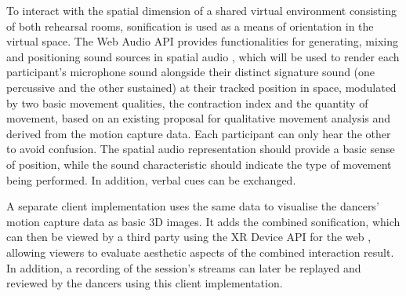 To interact with the spatial dimension of a shared virtual environment consisting of both rehearsal rooms, sonification is used as a means of orientation in the virtual space. The Web Audio \ac{API} provides functionalities for generating, mixing and positioning sound sources in spatial audio \parencite{webAudioSpec}, which will be used to render each participant's microphone sound alongside their distinct signature sound (one percussive and the other sustained) at their tracked position in space, modulated by two basic movement qualities, the contraction index and the quantity of movement, based on an existing proposal for qualitative movement analysis \parencite{movementQualities} and derived from the motion capture data. Each participant can only hear the other to avoid confusion. The spatial audio representation should provide a basic sense of position, while the sound characteristic should indicate the type of movement being performed. In addition, verbal cues can be exchanged.

A separate client implementation uses the same data to visualise the dancers' motion capture data as basic \ac{3D} images. It adds the combined sonification, which can then be viewed by a third party using the \ac{XR} Device \ac{API} for the web \parencite{webXrSpec}, allowing viewers to evaluate aesthetic aspects of the combined interaction result. In addition, a recording of the session's streams can later be replayed and reviewed by the dancers using this client implementation.
